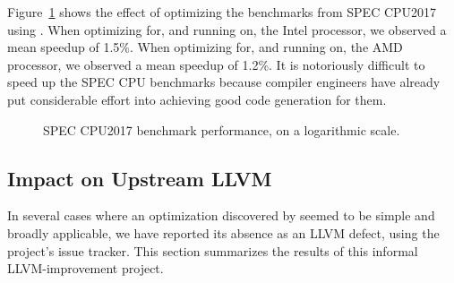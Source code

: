 Figure~\ref{fig:spec} shows the effect of optimizing the benchmarks
from SPEC CPU2017 using \minotaur.
%
When optimizing for, and running on, the Intel processor, we observed
a mean speedup of 1.5\%.
%
When optimizing for, and running on, the AMD processor, we observed a
mean speedup of 1.2\%.
%
It is notoriously difficult to speed up the SPEC CPU benchmarks
because compiler engineers have already put considerable effort into
achieving good code generation for them.

\begin{figure}[tbp]
  \centering
  \hfill
  \caption{SPEC CPU2017 benchmark performance, on a logarithmic scale.}
  \label{fig:spec}
\end{figure}

\subsection{Impact on Upstream LLVM}

In several cases where an optimization discovered by \minotaur{} seemed to
be simple and broadly applicable, we have reported its absence as an
LLVM defect, using the project's issue tracker.
%
This section summarizes the results of this informal LLVM-improvement
project.



